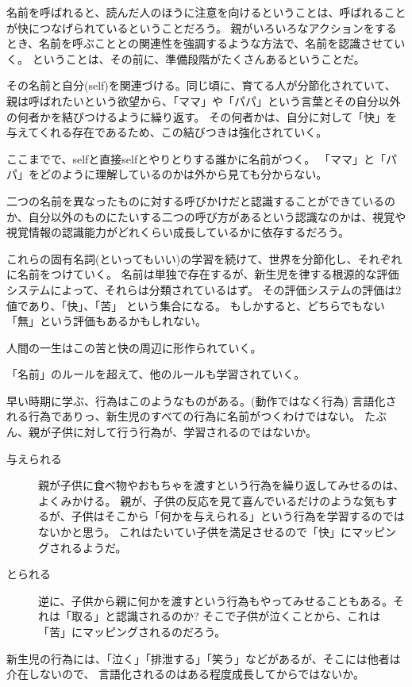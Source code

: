 \documentclass[10pt, oneside]{jarticle}   	%
\begin{document}
名前を呼ばれると、読んだ人のほうに注意を向けるということは、呼ばれることが快につなげられているということだろう。
親がいろいろなアクションをするとき、名前を呼ぶこととの関連性を強調するような方法で、名前を認識させていく。
ということは、その前に、準備段階がたくさんあるということだ。

その名前と自分(self)を関連づける。同じ頃に、育てる人が分節化されていて、親は呼ばれたいという欲望から、「ママ」や「パパ」という言葉とその自分以外の何者かを結びつけるように繰り返す。
その何者かは、自分に対して「快」を与えてくれる存在であるため、この結びつきは強化されていく。

ここまでで、selfと直接selfとやりとりする誰かに名前がつく。
「ママ」と「パパ」をどのように理解しているのかは外から見ても分からない。

二つの名前を異なったものに対する呼びかけだと認識することができているのか、自分以外のものにたいする二つの呼び方があるという認識なのかは、視覚や視覚情報の認識能力がどれくらい成長しているかに依存するだろう。

これらの固有名詞(といってもいい)の学習を続けて、世界を分節化し、それぞれに名前をつけていく。
名前は単独で存在するが、新生児を律する根源的な評価システムによって、それらは分類されているはず。
その評価システムの評価は2値であり、{「快」、「苦」} という集合になる。
もしかすると、どちらでもない「無」という評価もあるかもしれない。

人間の一生はこの苦と快の周辺に形作られていく。

「名前」のルールを超えて、他のルールも学習されていく。

早い時期に学ぶ、行為はこのようなものがある。(動作ではなく行為)
言語化される行為でありっ、新生児のすべての行為に名前がつくわけではない。
たぶん、親が子供に対して行う行為が、学習されるのではないか。

\begin{description}
\item[ 与えられる] 
親が子供に食べ物やおもちゃを渡すという行為を繰り返してみせるのは、よくみかける。
親が、子供の反応を見て喜んでいるだけのような気もするが、子供はそこから「何かを与えられる」という行為を学習するのではないかと思う。
これはたいてい子供を満足させるので「快」にマッピングされるようだ。
\item[とられる]
逆に、子供から親に何かを渡すという行為もやってみせることもある。それは「取る」と認識されるのか?
そこで子供が泣くことから、これは「苦」にマッピングされるのだろう。
\end{description}

新生児の行為には、「泣く」「排泄する」「笑う」などがあるが、そこには他者は介在しないので、
言語化されるのはある程度成長してからではないか。
\end{document}
